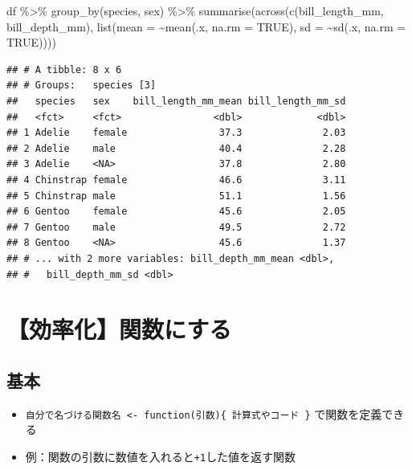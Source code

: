 \documentclass[
  xelatex,ja=standard, b5paper]{bxjsbook}
\newenvironment{Shaded}{\begin{snugshade}}{\end{snugshade}}
\newcommand{\AttributeTok}[1]{\textcolor[rgb]{0.77,0.63,0.00}{#1}}
\newcommand{\ConstantTok}[1]{\textcolor[rgb]{0.00,0.00,0.00}{#1}}
\newcommand{\FunctionTok}[1]{\textcolor[rgb]{0.00,0.00,0.00}{#1}}
\newcommand{\NormalTok}[1]{#1}
\newcommand{\SpecialCharTok}[1]{\textcolor[rgb]{0.00,0.00,0.00}{#1}}
\providecommand{\tightlist}{%
  \setlength{\itemsep}{0pt}\setlength{\parskip}{0pt}}
\begin{document}
\begin{Shaded}
\begin{Highlighting}[]
\NormalTok{df }\SpecialCharTok{\%\textgreater{}\%} 
  \FunctionTok{group\_by}\NormalTok{(species, sex) }\SpecialCharTok{\%\textgreater{}\%} 
  \FunctionTok{summarise}\NormalTok{(}\FunctionTok{across}\NormalTok{(}\FunctionTok{c}\NormalTok{(bill\_length\_mm, bill\_depth\_mm),}
                   \FunctionTok{list}\NormalTok{(}\AttributeTok{mean =} \SpecialCharTok{\textasciitilde{}}\FunctionTok{mean}\NormalTok{(.x, }\AttributeTok{na.rm =} \ConstantTok{TRUE}\NormalTok{),}
                        \AttributeTok{sd =} \SpecialCharTok{\textasciitilde{}}\FunctionTok{sd}\NormalTok{(.x, }\AttributeTok{na.rm =} \ConstantTok{TRUE}\NormalTok{))))}
\end{Highlighting}
\end{Shaded}

\begin{verbatim}
## # A tibble: 8 x 6
## # Groups:   species [3]
##   species   sex    bill_length_mm_mean bill_length_mm_sd
##   <fct>     <fct>                <dbl>             <dbl>
## 1 Adelie    female                37.3              2.03
## 2 Adelie    male                  40.4              2.28
## 3 Adelie    <NA>                  37.8              2.80
## 4 Chinstrap female                46.6              3.11
## 5 Chinstrap male                  51.1              1.56
## 6 Gentoo    female                45.6              2.05
## 7 Gentoo    male                  49.5              2.72
## 8 Gentoo    <NA>                  45.6              1.37
## # ... with 2 more variables: bill_depth_mm_mean <dbl>,
## #   bill_depth_mm_sd <dbl>
\end{verbatim}

\hypertarget{su-fun}{%
\section{【効率化】関数にする}\label{su-fun}}

\hypertarget{su-fun-st}{%
\subsection{基本}\label{su-fun-st}}

\begin{itemize}
\tightlist
\item
  \texttt{自分で名づける関数名\ \textless{}-\ function(引数)\{\ 計算式やコード\ \}} で関数を定義できる
\item
  例：関数の引数に数値を入れると\texttt{+1}した値を返す関数
\end{itemize}
\end{document}
